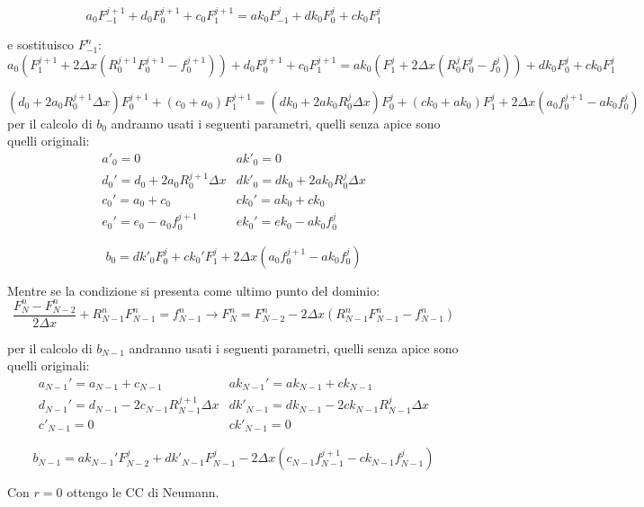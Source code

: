 \documentclass[]{article}
\newcommand{\lr}[3]{\ensuremath{\left#1 #3 \right#2}}
\newcommand{\lrt}[1]{\lr{(}{)}{#1}}
\numberwithin{equation}{subsection}
\begin{document}
$$
a_0  F_{-1}^{j+1} + d_0 F_{0}^{j+1} + c_{0}F_{1}^{j+1} = 
ak_0 F_{-1}^{j}   + dk_0 F_{0}^{j}  + ck_0 F_{1}^{j}
$$

e sostituisco $F_{-1}^{n}$:
$$
a_0 \lrt{ F_{1}^{j+1} + 2 \Delta x \lrt{R_0^{j+1}F_{0}^{j+1}-f^{j+1}_0}} +d_0 F_{0}^{j+1} +c_{0}F_{1}^{j+1} = 
ak_0 \lrt{F_{1}^{j} + 2 \Delta x \lrt{R_0^jF_{0}^{j}-f^{j}_0}} + dk_0 F_{0}^{j} + ck_0 F_{1}^{j}
$$

$$
\lrt{d_0 + 2 a_0 R_0^{j+1}\Delta x} F_0^{j+1} + \lrt{c_0+a_0}F^{j+1}_1 = 
\lrt{dk_0 + 2 ak_0 R_0^{j}\Delta x} F_0^{j} + \lrt{ck_0+ak_0}F^{j}_1 + 
2 \Delta x \lrt{a_0 f^{j+1}_0-ak_0 f^j_0}
$$
per il calcolo di $b_0$ andranno usati i seguenti parametri, quelli senza apice sono quelli originali:
$$
\begin{array}{ll}
a'_0 = 0 & ak'_0= 0\\
d_0' = d_0 + 2 a_0 R_0^{j+1}\Delta x& dk'_0 = dk_0 + 2 ak_0 R_0^{j}\Delta x\\
c_0' = a_0+c_0 & ck_0' = ak_0+ck_0\\
e_0' = e_0 - a_0 f^{j+1}_0 & ek_0' = ek_0 - ak_0 f^{j}_0
\end{array}
$$

$$b_0 = dk'_0 F_0^j  + ck_0' F_1^j + 2 \Delta x \lrt{a_0 f^{j+1}_0-ak_0 f^j_0}$$

Mentre se la condizione si presenta come ultimo punto del dominio:
$$\frac{F_{N}^{n}-F_{N-2}^{n}}{2\Delta x} + R_{N-1}^nF_{N-1}^{n} = f_{N-1}^n  \to 
F_{N}^{n} = F_{N-2}^{n} - 2\Delta x \lrt{R_{N-1}^nF_{N-1}^{n}-f^n_{N-1}}$$

per il calcolo di $b_{N-1}$ andranno usati i seguenti parametri, quelli senza apice sono quelli originali:
$$
\begin{array}{ll}
a_{N-1}' = a_{N-1}+c_{N-1} & ak_{N-1}' = ak_{N-1}+ck_{N-1}\\
d_{N-1}' = d_{N-1} - 2 c_{N-1} R_{N-1}^{j+1}\Delta x& dk'_{N-1} = dk_{N-1} - 2 ck_{N-1} R_{N-1}^{j}\Delta x\\
c'_{N-1} = 0 & ck'_{N-1}= 0
\end{array}
$$

$$b_{N-1} = ak_{N-1}' F_{N-2}^j + dk'_{N-1} F_{N-1}^j - 2 \Delta x \lrt{c_{N-1} f^{j+1}_{N-1}-ck_{N-1} f^j_{N-1}}$$

Con $r=0$ ottengo le CC di Neumann.
\end{document}
